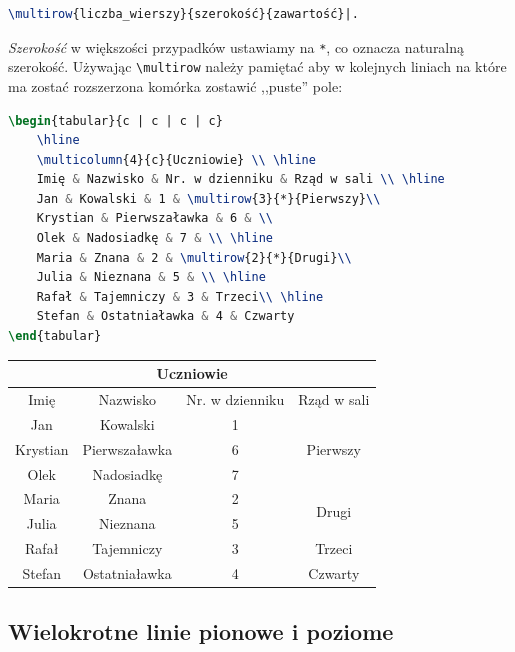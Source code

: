 \documentclass[10pt,a4paper]{article}
\begin{document}
\begin{lstlisting}[language=TeX]
\multirow{liczba_wierszy}{szerokość}{zawartość}|. 
\end{lstlisting}

\emph{Szerokość} w większości przypadków ustawiamy na \lstinline|*|, co oznacza naturalną szerokość. Używając \lstinline|\multirow| należy pamiętać aby w kolejnych liniach na które ma zostać rozszerzona komórka zostawić ,,puste'' pole:

\begin{lstlisting}[language=TeX]
\begin{tabular}{c | c | c | c}
	\hline
	\multicolumn{4}{c}{Uczniowie} \\ \hline
	Imię & Nazwisko & Nr. w dzienniku & Rząd w sali \\ \hline
	Jan & Kowalski & 1 & \multirow{3}{*}{Pierwszy}\\
	Krystian & Pierwszaławka & 6 & \\
	Olek & Nadosiadkę & 7 & \\ \hline
	Maria & Znana & 2 & \multirow{2}{*}{Drugi}\\
	Julia & Nieznana & 5 & \\ \hline
	Rafał & Tajemniczy & 3 & Trzeci\\ \hline
	Stefan & Ostatniaławka & 4 & Czwarty
\end{tabular}
\end{lstlisting}

\begin{tabular}{c | c | c | c}
	\hline
	\multicolumn{4}{c}{Uczniowie} \\ \hline
	Imię & Nazwisko & Nr. w dzienniku & Rząd w sali \\ \hline
	Jan & Kowalski & 1 & \multirow{3}{*}{Pierwszy}\\
	Krystian & Pierwszaławka & 6 & \\
	Olek & Nadosiadkę & 7 & \\ \hline
	Maria & Znana & 2 & \multirow{2}{*}{Drugi}\\
	Julia & Nieznana & 5 & \\ \hline
	Rafał & Tajemniczy & 3 & Trzeci\\ \hline
	Stefan & Ostatniaławka & 4 & Czwarty
\end{tabular}

\subsection{Wielokrotne linie pionowe i poziome}
\end{document}
